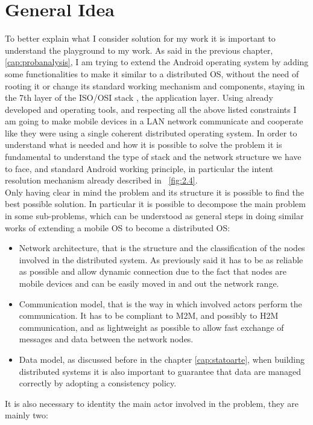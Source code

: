 \section{General Idea}
\par To better explain what I consider solution for my work it is important to
understand the playground to my work. As said in the previous chapter, \ref{cap:probanalysis}, I
am trying to extend the Android operating system by adding some functionalities to make it similar to a distributed OS, without the need of rooting it or change its standard working mechanism and components, staying in the 7th layer of the ISO/OSI stack , the application layer. Using already developed and operating tools, and respecting all the above listed constraints I am going to make mobile devices in a LAN network communicate and cooperate like they were using a single coherent distributed operating system.
In order to understand what is needed and how it is possible to solve the problem
it is fundamental to understand the type of stack and the network structure
we have to face, and standard Android working principle, in particular the intent resolution mechanism already described in \figurename~\ref{fig:2.4}.\\
Only having clear in mind the problem and its structure it is possible to find the best possible solution. In particular it is possible to decompose the main problem in some sub-problems, which can be understood as general steps in doing similar works of extending a mobile OS to become a distributed OS:
\begin{itemize}
	\item Network architecture, that is the structure and the classification of the nodes involved in the distributed system. As previously said it has to be as reliable  as possible and allow dynamic connection due to the fact that nodes are mobile devices and can be easily moved in and out the network range.
	\item Communication model, that is the way in which involved actors perform the communication. It has to be compliant to M2M, and possibly to H2M communication, and as lightweight as possible to allow fast exchange of messages and data between the network nodes.
	\item Data model, as discussed before in the chapter \ref{cap:statoarte}, when building distributed systems it is also important to guarantee that data are managed correctly by adopting a consistency policy.
\end{itemize}
It is also necessary to identity the main actor involved in the problem, they are mainly two:
